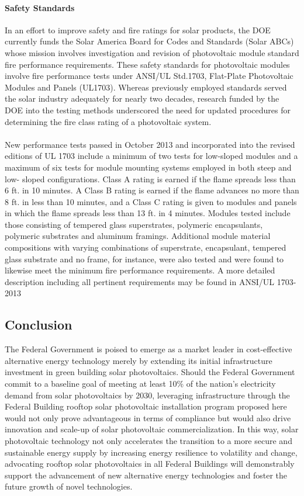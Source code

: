 \paragraph{Safety Standards}
In an effort to improve safety and fire ratings for solar products, the DOE currently funds the Solar America Board for Codes and Standards (Solar ABCs) whose mission involves investigation and revision of photovoltaic module standard fire performance requirements. These safety standards for photovoltaic modules involve fire performance tests under ANSI/UL Std.1703, Flat-Plate Photovoltaic Modules and Panels (UL1703). Whereas previously employed standards served the solar industry adequately for nearly two decades, research funded by the DOE into the testing methods underscored the need for updated procedures for determining the fire class rating of a photovoltaic system.
\\\\
\noindent New performance tests passed in October 2013 and incorporated into the revised editions of UL 1703 include a minimum of two tests for low-sloped modules and a maximum of six tests for module mounting systems employed in both steep and low- sloped configurations. Class A rating is earned if the flame spreads less than 6 ft. in 10 minutes. A Class B rating is earned if the flame advances no more than 8 ft. in less than 10 minutes, and a Class C rating is given to modules and panels in which the flame spreads less than 13 ft. in 4 minutes. Modules tested include those consisting of tempered glass superstrates, polymeric encapsulants, polymeric substrates and aluminum framings. Additional module material compositions with varying combinations of superstrate, encapsulant, tempered glass substrate and no frame, for instance, were also tested and were found to likewise meet the minimum fire performance requirements. A more detailed description including all pertinent requirements may be found in ANSI/UL 1703-2013

\subsection{Conclusion}
The Federal Government is poised to emerge as a market leader in cost-effective alternative energy technology merely by extending its initial infrastructure investment in green building solar photovoltaics. Should the Federal Government commit to a baseline goal of meeting at least 10\% of the nation’s electricity demand from solar photovoltaics by 2030, leveraging infrastructure through the Federal Building rooftop solar photovoltaic installation program proposed here would not only prove advantageous in terms of compliance but would also drive innovation and scale-up of solar photovoltaic commercialization. In this way, solar photovoltaic technology not only accelerates the transition to a more secure and sustainable energy supply by increasing energy resilience to volatility and change, advocating rooftop solar photovoltaics in all Federal Buildings will demonstrably support the advancement of new alternative energy technologies and foster the future growth of novel technologies.
